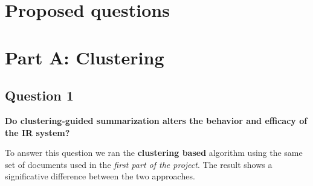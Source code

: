 \section{Proposed questions}

\section*{Part A: Clustering}

\subsection{Question 1}
\textbf{Do clustering-guided summarization alters the behavior and efficacy of the IR system?}

To answer this question we ran the \textbf{clustering based} algorithm using
the same set of documents used in the \textit{first part of the project}. The
result shows a significative difference between the two approaches.

